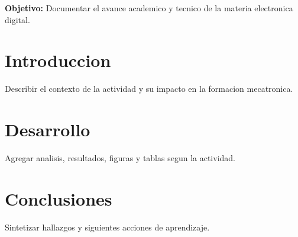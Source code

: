 \documentclass[spanish,letterpaper,oneside]{article}
\begin{document}
\templatePortrait
\templatePagecfg
\onehalfspacing

\begin{abstractd}
\textbf{Objetivo:} Documentar el avance academico y tecnico de la materia electronica digital.
\end{abstractd}

\templateIndex
\templateFinalcfg

\section{Introduccion}
Describir el contexto de la actividad y su impacto en la formacion mecatronica.

\section{Desarrollo}
Agregar analisis, resultados, figuras y tablas segun la actividad.

\section{Conclusiones}
Sintetizar hallazgos y siguientes acciones de aprendizaje.



\end{document}
